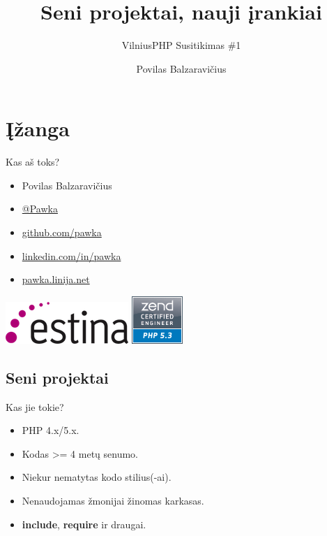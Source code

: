 \documentclass[12pt,a4paper]{beamer}
\author{Povilas Balzaravičius}
\title{Seni projektai, nauji įrankiai}
\subtitle{VilniusPHP Susitikimas \#1}
\begin{document}
\begin{frame}
	\titlepage
\end{frame}

\section{Įžanga}
\begin{frame}{Kas aš toks?}
    \begin{itemize}
        \item Povilas Balzaravičius
        \item \href{https://twitter.com/pawka}{@Pawka}
        \item \href{https://github.com/pawka}{github.com/pawka}
        \item \href{https://linkedin.com/in/pawka}{linkedin.com/in/pawka}
        \item \href{http://pawka.linija.net}{pawka.linija.net}
    \end{itemize}
    \begin{center}
        \includegraphics[scale=0.4]{img/estina.png}
        \hskip1cm
        \includegraphics[scale=0.4]{img/zce-php5-3-logo.png}
    \end{center}
\end{frame}

\subsection{Seni projektai}
\begin{frame}{Kas jie tokie?}
    \begin{itemize}
        \item PHP 4.x/5.x.
        \item Kodas >= 4 metų senumo.
        \item Niekur nematytas kodo stilius(-ai).
        \item Nenaudojamas žmonijai žinomas karkasas.
        \item \textbf{include}, \textbf{require} ir draugai.
    \end{itemize}
\end{frame}
\end{document}
